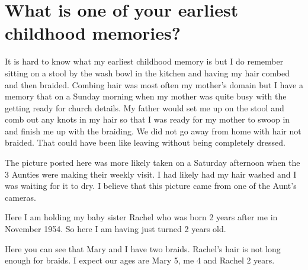 \section{What is one of your earliest childhood memories?}
It is hard to know what my earliest childhood memory is but I do remember sitting on a stool by the wash bowl in the kitchen and having my hair combed and then braided.
Combing hair was most often my mother's domain but I have a memory that on a Sunday morning when my mother was quite busy with the getting ready for church details.
My father would set me up on the stool and comb out any knots in my hair so that I was ready for my mother to swoop in and finish me up with the braiding.
We did not go away from home with hair not braided.
That could have been like leaving without being completely dressed.

The picture posted here was more likely taken on a Saturday afternoon when the 3 Aunties were making their weekly visit.
I had likely had my hair washed and I was waiting for it to dry.
I believe that this picture came from one of the Aunt's cameras.

Here I am holding my baby sister Rachel who was born 2 years after me in November 1954.
So here I am having just turned 2 years old.

Here you can see that Mary and I have two braids.
Rachel's hair is not long enough for braids.
I expect our ages are Mary 5, me 4 and Rachel 2 years.
